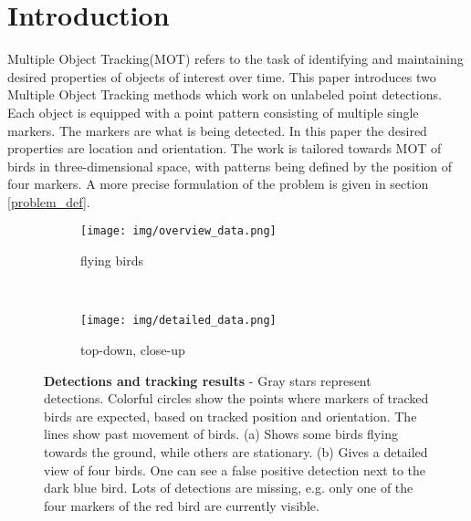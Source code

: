 \documentclass[12pt,a4paper]{article}
\begin{document}
\section{Introduction}
Multiple Object Tracking(MOT) refers to the task of identifying and maintaining desired properties of objects of interest over time.
This paper introduces two Multiple Object Tracking methods which work on unlabeled point detections. Each object is equipped with a point pattern consisting of multiple single markers. The markers are what is being detected. In this paper the desired properties are location and orientation. The work is tailored towards MOT of birds in three-dimensional space, with patterns being defined by the position of four markers. A more precise formulation of the problem is given in section \ref{problem_def}.
\begin{figure}[!htbp]
	\centering
	\begin{subfigure}[b]{0.42\textwidth}
		\texttt{[image: img/overview\_data.png]}
		\caption{flying birds}
	\end{subfigure} ~
	\begin{subfigure}[b]{0.455\textwidth}
			\texttt{[image: img/detailed\_data.png]}
		\caption{top-down, close-up}
		\label{detections_problems}
	\end{subfigure}
	\vspace{\baselineskip}
	\caption{\textbf{Detections and tracking results} - Gray stars represent detections. Colorful circles show the points where markers of tracked birds are expected, based on tracked position and orientation. The lines show past movement of birds. (a) Shows some birds flying towards the ground, while others are stationary. (b) Gives a detailed view of four birds. One can see a false positive detection next to the dark blue bird. Lots of detections are missing, e.g. only one of the four markers of the red bird are currently visible.}
    \label{data_impression}
\end{figure}
\end{document}
